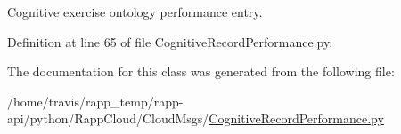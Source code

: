 Cognitive exercise ontology performance entry. 



Definition at line 65 of file Cognitive\-Record\-Performance.\-py.



The documentation for this class was generated from the following file\-:\begin{DoxyCompactItemize}
\item 
/home/travis/rapp\-\_\-temp/rapp-\/api/python/\-Rapp\-Cloud/\-Cloud\-Msgs/\hyperlink{CognitiveRecordPerformance_8py}{Cognitive\-Record\-Performance.\-py}\end{DoxyCompactItemize}
